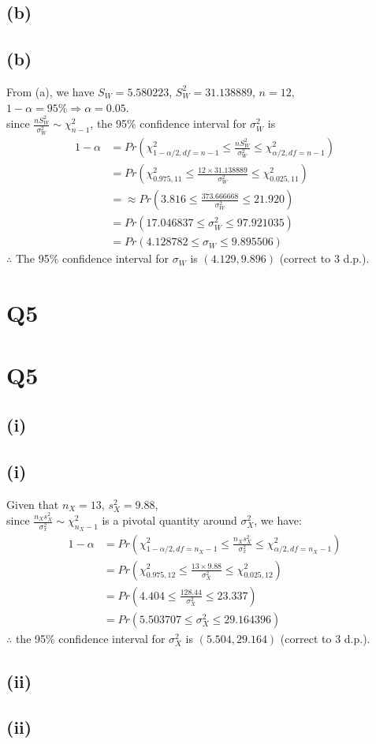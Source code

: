 \documentclass{article}
\newcommand{\mysectionstar}[2][]{%
    \ifthenelse{\equal{#1}{}}%
        {\section*{#2}}%
        {\section*[#1]{#2}}%
    \outline{1}{#2}%
}
\newcommand{\mysubsectionstar}[2][]{%
    \ifthenelse{\equal{#1}{}}%
        {\subsection*{#2}}%
        {\subsection*[#1]{#2}}%
    \outline{2}{#2}%
}
\begin{document}
\mysubsectionstar{(b)}

From (a), we have $S_W = 5.580223$, $S_W^2 = 31.138889$, $n=12$, $1-\alpha=95\% \Rightarrow \alpha = 0.05$. \\
since $\frac{nS_W^2}{\sigma_W^2} \sim \chi^2_{n-1}$, the 95$\%$ confidence interval for $\sigma_W^2$ is
\begin{align*}
1 - \alpha &= Pr(\chi^2_{1-\alpha/2, df=n-1} \leq \frac{nS_W^2}{\sigma_W^2} \leq \chi^2_{\alpha/2, df=n-1}) \\
&= Pr(\chi^2_{0.975, 11} \leq \frac{12 \times 31.138889}{\sigma_W^2} \leq \chi^2_{0.025, 11}) \\
&=\approx Pr(3.816 \leq \frac{373.666668}{\sigma_W^2} \leq 21.920) \\
&= Pr(17.046837 \leq \sigma_W^2 \leq 97.921035) \\
&= Pr(4.128782 \leq \sigma_W \leq 9.895506)
\end{align*}
$\therefore$ The 95$\%$ confidence interval for $\sigma_W$ is $(4.129, 9.896)$ (correct to 3 d.p.).

\mysectionstar{Q5}

\mysubsectionstar{(i)}

Given that $n_X = 13$, $s_X^2 = 9.88$, \\
since $\frac{n_{X} s_{X}^2}{\sigma_x^2} \sim \chi_{n_X - 1}^2$ is a pivotal quantity around $\sigma_X^2$, we have:
\begin{align*}
1 - \alpha &= Pr(\chi_{1-\alpha/2, df=n_X - 1}^2 \leq \frac{n_{X} s_{X}^2}{\sigma_x^2} \leq \chi_{\alpha/2, df=n_X - 1}^2) \\
&= Pr(\chi_{0.975, 12}^2 \leq \frac{13 \times 9.88}{\sigma_X^2} \leq \chi_{0.025, 12}^2) \\
&= Pr(4.404 \leq \frac{128.44}{\sigma_X^2} \leq 23.337) \\
&= Pr(5.503707 \leq \sigma_X^2 \leq 29.164396)
\end{align*}
$\therefore$ the 95$\%$ confidence interval for $\sigma_X^2$ is $(5.504, 29.164)$ (correct to 3 d.p.).
\mysubsectionstar{(ii)}
\end{document}
